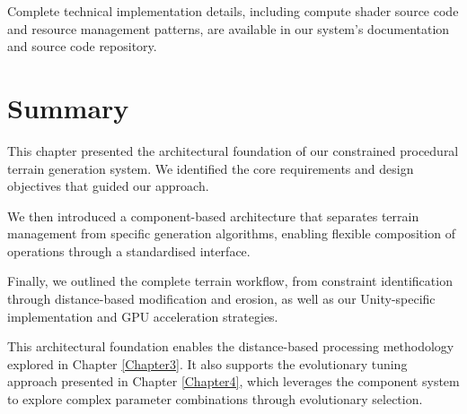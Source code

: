 Complete technical implementation details, including compute shader source code and resource management patterns, are available in our system's documentation and source code repository.

\section{Summary}

This chapter presented the architectural foundation of our constrained procedural terrain generation system. We identified the core requirements and design objectives that guided our approach.

We then introduced a component-based architecture that separates terrain management from specific generation algorithms, enabling flexible composition of operations through a standardised interface. 

Finally, we outlined the complete terrain workflow, from constraint identification through distance-based modification and erosion, as well as our Unity-specific implementation and GPU acceleration strategies.

This architectural foundation enables the distance-based processing methodology explored in Chapter \ref{Chapter3}. It also supports the evolutionary tuning approach presented in Chapter \ref{Chapter4}, which leverages the component system to explore complex parameter combinations through evolutionary selection.
